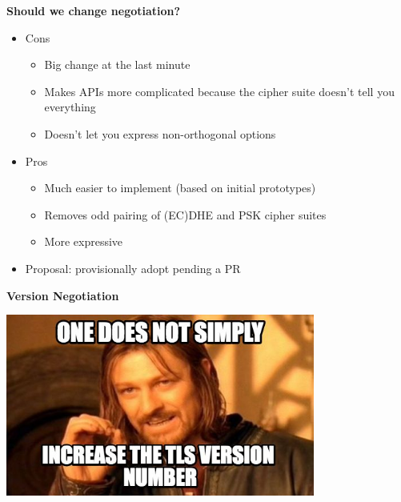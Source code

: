 \documentclass[helvetica]{seminar}
\newcommand{\heading}[1]{%
  \begin{center} 
    \large\bf 
    #1 
  \end{center} 
  \vspace{.4 in}}
\begin{document}
\begin{slide}
\heading{Should we change negotiation?}

\begin{itemize}
\item Cons
  \begin{itemize}
  \item Big change at the last minute
  \item Makes APIs more complicated because the cipher suite doesn't tell you everything
  \item Doesn't let you express non-orthogonal options
  \end{itemize}

\item Pros
  \begin{itemize}
  \item Much easier to implement (based on initial prototypes)
  \item Removes odd pairing of (EC)DHE and PSK cipher suites
  \item More expressive
  \end{itemize}

\item Proposal: provisionally adopt pending a PR
\end{itemize}

\end{slide}


\begin{slide}
\heading{Version Negotiation}

\includegraphics[width=4in]{932382}

\end{slide}
\end{document}
